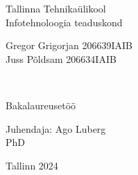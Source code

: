 \begin{titlepage}

\headheight=57pt
\footskip=5pt
\headsep=0pt

\centering
Tallinna Tehnikaülikool\\
Infotehnoloogia teaduskond

\vspace*{4.5 cm}

\begin{center}

Gregor Grigorjan 206639IAIB\\
Juss Põldsam 206634IAIB\\
\vspace*{1.5 cm}

\begin{Large}
\textsc{\textbf{\thesisTitle}}\\
\end{Large}

\vspace*{1.5 cm}
Bakalaureusetöö
\end{center}

\vspace*{0.6 cm}

\begin{flushright}
Juhendaja: Ago Luberg\\PhD\\
\vspace*{0.2 cm}
\end{flushright}
\vfill

Tallinn 2024
\end{titlepage}

